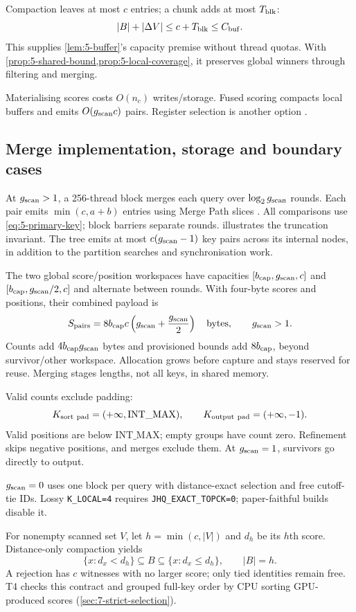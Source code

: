 Compaction leaves at most $c$ entries; a chunk adds at most $T_{\rm blk}$:
\[
 |B|+|\Delta V|\leq c+T_{\rm blk}\leq C_{\rm buf}.
\]
This supplies \cref{lem:5-buffer}'s capacity premise without thread quotas. With \cref{prop:5-shared-bound,prop:5-local-coverage}, it preserves global winners through filtering and merging.

Materialising scores costs $O(n_c)$ writes/storage. Fused scoring compacts local buffers and emits $O(g_{\mathrm{scan}} c)$ pairs. Register selection is another option \cite{johnson_gpu}.

\subsection{Merge implementation, storage and boundary cases}

At $g_{\mathrm{scan}}>1$, a 256-thread block merges each query over $\log_2g_{\mathrm{scan}}$ rounds. Each pair emits $\min(c,a+b)$ entries using Merge Path slices \cite{gpu_merge_path}.
All comparisons use \cref{eq:5-primary-key}; block barriers separate
rounds.  illustrates the truncation invariant.
The tree emits at most $c(g_{\mathrm{scan}}-1)$ key pairs across its internal nodes,
in addition to the partition searches and synchronisation work.

The two global score/position workspaces have capacities
$[b_{\rm cap},g_{\mathrm{scan}},c]$ and $[b_{\rm cap},g_{\mathrm{scan}}/2,c]$ and alternate between
rounds. With four-byte scores and positions, their combined payload is
\begin{equation}
 S_{\rm pairs}=8b_{\rm cap}c\left(g_{\mathrm{scan}}+\frac{g_{\mathrm{scan}}}{2}\right)
 \quad\text{bytes},\qquad g_{\mathrm{scan}}>1.
 \label{eq:5-group-workspace}
\end{equation}
Counts add $4b_{\rm cap}g_{\mathrm{scan}}$ bytes and provisioned bounds add $8b_{\rm cap}$, beyond survivor/other workspace. Allocation grows before capture and stays reserved for reuse. Merging stages lengths, not all keys, in shared memory.

Valid counts exclude padding:
\[
 K_{\rm sort\ pad}=(+\infty,\mathrm{INT\_MAX}),\qquad
 K_{\rm output\ pad}=(+\infty,-1).
\]
Valid positions are below $\mathrm{INT\_MAX}$; empty groups have count zero. Refinement skips negative positions, and merges exclude them. At $g_{\mathrm{scan}}=1$, survivors go directly to output.

$g_{\mathrm{scan}}=0$ uses one block per query with distance-exact selection and free cutoff-tie IDs. Lossy \texttt{K\_LOCAL=4} requires \texttt{JHQ\_EXACT\_TOPCK=0}; paper-faithful builds disable it.

For nonempty scanned set $V$, let $h=\min(c,|V|)$ and $d_h$ be its $h$th score. Distance-only compaction yields
\[
 \{x:d_x<d_h\}\subseteq B\subseteq\{x:d_x\leq d_h\},\qquad |B|=h.
\]
A rejection has $c$ witnesses with no larger score; only tied identities remain free. T4 checks this contract and grouped full-key order by CPU sorting GPU-produced scores (\cref{sec:7-strict-selection}).